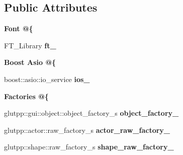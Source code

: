 \subsection*{\-Public \-Attributes}
\begin{Indent}{\bf \-Font @\{}\par
\begin{DoxyCompactItemize}
\item 
\hypertarget{classglutpp_1_1master_a592c6c858ab83ef126cd00ad2369dea2}{\-F\-T\-\_\-\-Library {\bfseries ft\-\_\-}}\label{classglutpp_1_1master_a592c6c858ab83ef126cd00ad2369dea2}

\end{DoxyCompactItemize}
\end{Indent}
\begin{Indent}{\bf \-Boost \-Asio @\{}\par
\begin{DoxyCompactItemize}
\item 
\hypertarget{classglutpp_1_1master_a35e69672b100fd82e9ff538ef120a85a}{boost\-::asio\-::io\-\_\-service {\bfseries ios\-\_\-}}\label{classglutpp_1_1master_a35e69672b100fd82e9ff538ef120a85a}

\end{DoxyCompactItemize}
\end{Indent}
\begin{Indent}{\bf \-Factories @\{}\par
\begin{DoxyCompactItemize}
\item 
\hypertarget{classglutpp_1_1master_a2d4c1404d4ce9241304b4de5040f9ebe}{glutpp\-::gui\-::object\-::object\-\_\-factory\-\_\-s {\bfseries object\-\_\-factory\-\_\-}}\label{classglutpp_1_1master_a2d4c1404d4ce9241304b4de5040f9ebe}

\item 
\hypertarget{classglutpp_1_1master_a63f4ef4068e6e045d79d943a50233a61}{glutpp\-::actor\-::raw\-\_\-factory\-\_\-s {\bfseries actor\-\_\-raw\-\_\-factory\-\_\-}}\label{classglutpp_1_1master_a63f4ef4068e6e045d79d943a50233a61}

\item 
\hypertarget{classglutpp_1_1master_aae46f8577d3f033018d8b3acdadec4f2}{glutpp\-::shape\-::raw\-\_\-factory\-\_\-s {\bfseries shape\-\_\-raw\-\_\-factory\-\_\-}}\label{classglutpp_1_1master_aae46f8577d3f033018d8b3acdadec4f2}

\end{DoxyCompactItemize}
\end{Indent}
